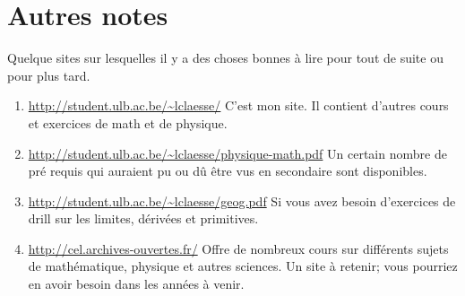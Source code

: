 					\section*{Autres notes}

Quelque sites sur lesquelles il y a des choses bonnes à lire pour tout de suite ou pour plus tard.
\begin{enumerate}
	\item
		\url{http://student.ulb.ac.be/~lclaesse/} C'est mon site. Il contient d'autres cours et exercices de math et de physique.
	\item
		\url{http://student.ulb.ac.be/~lclaesse/physique-math.pdf} Un certain nombre de pré requis qui auraient pu ou dû être vus en secondaire sont disponibles.
	\item
		\url{http://student.ulb.ac.be/~lclaesse/geog.pdf} Si vous avez besoin d'exercices de drill sur les limites, dérivées et primitives.
	\item
		\url{http://cel.archives-ouvertes.fr/} Offre de nombreux cours sur différents sujets de mathématique, physique et autres sciences. Un site à retenir; vous pourriez en avoir besoin dans les années à venir.

\end{enumerate}
